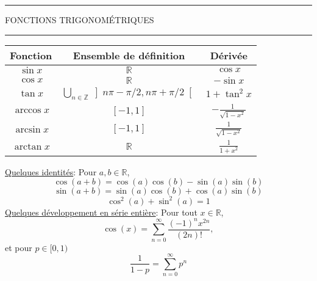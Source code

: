 \documentclass[11pt, addpoints, answers]{exam}
\begin{document}
\newpage
\hrule
\vspace*{.15in}
\begin{center}
	\large\MakeUppercase{Fonctions Trigonométriques}
\end{center}
\vspace*{.15in}
\hrule
\vspace*{.25in}


\renewcommand\arraystretch{3.5}
\begin{table}[H]
\begin{center}
\begin{tabular}{|c|c|c|}
\hline
Fonction & Ensemble de définition& Dérivée \\
\hline\hline
$\sin x$ &$\mathbb{R}$& $\cos x$ \\
\hline
$\cos x$ &$\mathbb{R}$& $-\sin x$ \\
\hline
$\tan x$ &$\bigcup_{n\in\mathbb{Z}}\left]n\pi-\pi/2, n\pi+\pi/2\right[$ & $1+\tan^2 x$ \\
\hline
$\arccos x$ &$[-1,1]$& $-\frac{1}{\sqrt{1-x^2}}$ \\
\hline
$\arcsin x$ &$[-1,1]$& $\frac{1}{\sqrt{1-x^2}}$\\
\hline
$\arctan x$ &$\mathbb{R}$& $\frac{1}{1+x^2}$ \\
\hline
\end{tabular}
\end{center}
\end{table}%
\underline{Quelques identités}: Pour $a,b\in\mathbb{R}$,\\
$$
\cos(a+b) = \cos(a)\cos(b)-\sin(a)\sin(b)
$$
$$
\sin(a+b) = \sin(a)\cos(b)+\cos(a)\sin(b)
$$
$$
\cos^2(a)+\sin^2(a) = 1
$$
\underline{Quelques développement en série entière}: Pour tout $x\in\mathbb{R}$,\\
$$
\cos(x) = \sum_{n = 0}^\infty\frac{(-1)^nx^{2n}}{(2n)!},
$$
et pour $p\in [0,1)$
$$
\frac{1}{1-p}=\sum_{n=0}^\infty p^n
$$
\end{document}
